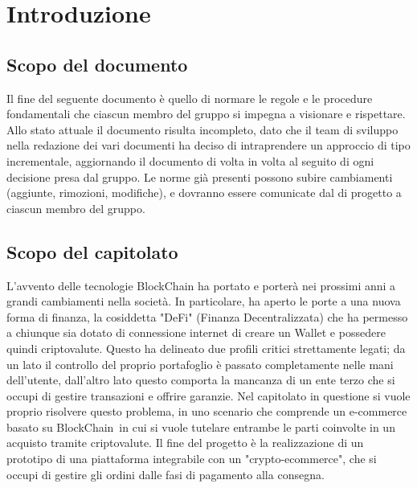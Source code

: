 \section{Introduzione} \label{section: introduzione}

\subsection {Scopo del documento}
Il fine del seguente documento è quello di normare le regole e le procedure fondamentali che ciascun membro del gruppo \groupName{} si impegna a visionare e rispettare.
Allo stato attuale il documento risulta incompleto, dato che il team di sviluppo nella redazione dei vari documenti ha deciso di intraprendere un approccio di tipo incrementale, aggiornando il documento di volta in volta al seguito di ogni decisione presa dal gruppo.
Le norme già presenti possono subire cambiamenti (aggiunte, rimozioni, modifiche), e dovranno essere comunicate dal \roleProjectManagerLow{} di progetto a ciascun membro del gruppo.

\vspace{2cm}

\subsection{Scopo del capitolato}
L'avvento delle tecnologie BlockChain\glo{} ha portato e porterà nei prossimi anni a grandi cambiamenti nella società. 
In particolare, ha aperto le porte a una nuova forma di finanza, la cosiddetta "DeFi" (Finanza Decentralizzata) che ha permesso a chiunque sia dotato di connessione internet di creare un Wallet\glo{} e possedere quindi criptovalute\glo{}.
Questo ha delineato due profili critici strettamente legati; da un lato il controllo del proprio portafoglio è passato completamente nelle mani dell'utente, dall'altro lato questo comporta la mancanza di un ente terzo che si occupi di gestire transazioni e offrire garanzie.
\newline
Nel capitolato in questione si vuole proprio risolvere questo problema, in uno scenario che comprende un e-commerce\glo{} basato su BlockChain\glo\ in cui si vuole tutelare entrambe le parti coinvolte in un acquisto tramite criptovalute.
\newline
Il fine del progetto è la realizzazione di un prototipo di una piattaforma integrabile con un "crypto-ecommerce\glo{}", che si occupi di gestire gli ordini dalle fasi di pagamento alla consegna.

